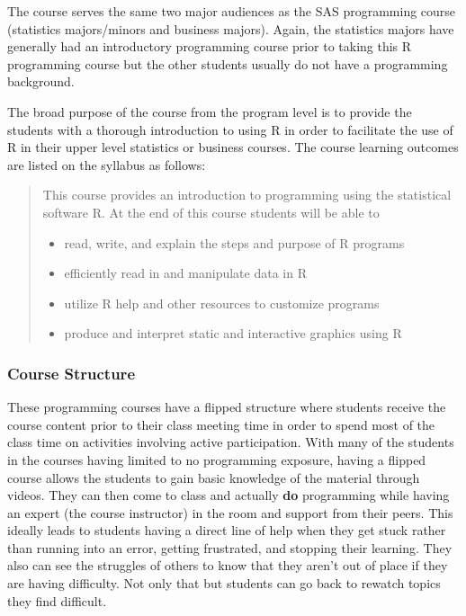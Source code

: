 \documentclass[
  letterpaper,
  DIV=11,
  numbers=noendperiod]{scrartcl}
\providecommand{\tightlist}{%
  \setlength{\itemsep}{0pt}\setlength{\parskip}{0pt}}\usepackage{longtable,booktabs,array}
\begin{document}
The course serves the same two major audiences as the SAS programming
course (statistics majors/minors and business majors). Again, the
statistics majors have generally had an introductory programming course
prior to taking this R programming course but the other students usually
do not have a programming background.

The broad purpose of the course from the program level is to provide the
students with a thorough introduction to using R in order to facilitate
the use of R in their upper level statistics or business courses. The
course learning outcomes are listed on the syllabus as follows:

\begin{quote}
This course provides an introduction to programming using the
statistical software R. At the end of this course students will be able
to

\begin{itemize}
\tightlist
\item
  read, write, and explain the steps and purpose of R programs
\item
  efficiently read in and manipulate data in R
\item
  utilize R help and other resources to customize programs
\item
  produce and interpret static and interactive graphics using R
\end{itemize}
\end{quote}

\hypertarget{course-structure}{%
\subsubsection{Course Structure}\label{course-structure}}

These programming courses have a flipped structure where students
receive the course content prior to their class meeting time in order to
spend most of the class time on activities involving active
participation. With many of the students in the courses having limited
to no programming exposure, having a flipped course allows the students
to gain basic knowledge of the material through videos. They can then
come to class and actually \textbf{do} programming while having an
expert (the course instructor) in the room and support from their peers.
This ideally leads to students having a direct line of help when they
get stuck rather than running into an error, getting frustrated, and
stopping their learning. They also can see the struggles of others to
know that they aren't out of place if they are having difficulty. Not
only that but students can go back to rewatch topics they find
difficult.
\end{document}

